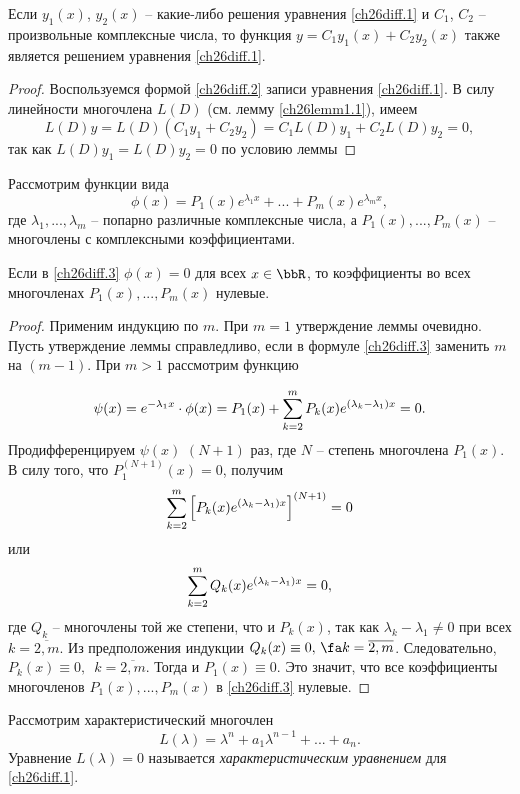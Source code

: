 \begin{lemm} \label{ch26lemm2.1}
Если $y_1(x)$, $y_2(x)$ -- какие-либо решения уравнения \eqref{ch26diff.1}  и $C_1$, $C_2$ -- произвольные комплексные числа, то функция $y=C_1y_1(x)+C_2y_2(x)$ также является решением уравнения \eqref{ch26diff.1}.
\end{lemm}

\begin{proof}
Воспользуемся формой \eqref{ch26diff.2} записи уравнения \eqref{ch26diff.1}. В силу линейности многочлена $L(D)$ (см. лемму \ref{ch26lemm1.1}), имеем
$$
L(D)y=L(D)(C_1y_1+C_2y_2)=C_1L(D)y_1+C_2L(D)y_2=0,
$$
так как $L(D)y_1=L(D)y_2=0$ по условию леммы
\end{proof}

Рассмотрим функции вида
\begin{equation} \label{ch26diff.3}
\phi(x)=P_1(x)e^{\lambda_1x}+...+P_m(x)e^{\lambda_mx},
\end{equation}
где $\lambda_1,...,\lambda_m$ -- попарно различные комплексные числа, а $P_1(x),...,P_m(x)$ -- многочлены с комплексными коэффициентами.


\begin{lemm}\label{ch26lemm2.2}
Если в \eqref{ch26diff.3} $\phi(x)=0$ для всех $x \in \bbR$, то коэффициенты во всех многочленах $P_1(x),...,P_m(x)$ нулевые.
\end{lemm}


\begin{proof}
Применим индукцию по $m$. При $m=1$ утверждение леммы очевидно. Пусть утверждение леммы справледливо, если в формуле \eqref{ch26diff.3} заменить $m$ на $(m-1)$. При $m>1$ рассмотрим функцию

$$
\psi(x)=e^{-\lambda_1x}\cdot\phi(x)=P_1(x)+ \sum_{k=2}^{m}\limits P_k(x)e^{(\lambda_k-\lambda_1)x}=0.
$$
Продифференцируем $\psi(x)$ $(N+1)$ раз, где $N$ -- степень многочлена $P_1(x)$. В силу того, что $P_1^{(N+1)}(x)=0$, получим 
$$
\sum_{k=2}^{m}\limits\left[P_k(x)e^{(\lambda_k-\lambda_1)x}\right]^{(N+1)}=0
$$
или
$$
\sum_{k=2}^{m}\limits Q_k(x)e^{(\lambda_k-\lambda_1)x}=0,
$$
где $Q_k$ -- многочлены той же степени, что и $P_k(x)$, так как $\lambda_k-\lambda_1 \neq 0$ при всех $k=\overline{2,m}$. Из предположения индукции $Q_k(x)\equiv 0,\,\fa k=\overline{2,m}$. Следовательно, $P_k(x)\equiv 0,\,$ $k=\overline{2,m}$. Тогда и $P_1(x)\equiv 0$. Это значит, что все коэффициенты многочленов $P_1(x),...,P_m(x)$ в \eqref{ch26diff.3} нулевые.
\end{proof}

Рассмотрим характеристический многочлен
$$
L(\lambda)=\lambda^n+a_1\lambda^{n-1}+...+a_n.
$$
Уравнение $L(\lambda)=0$ называется \textit{характеристическим уравнением} для \eqref{ch26diff.1}.


